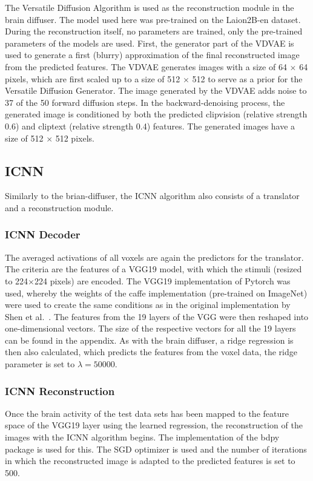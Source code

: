 The Versatile Diffusion Algorithm is used as the reconstruction module in the brain diffuser. The model used here was pre-trained on the Laion2B-en\cite{schuhmannLAION400MOpenDataset2021} dataset. During the reconstruction itself, no parameters are trained, only the pre-trained parameters of the models are used. First, the generator part of the VDVAE is used to generate a first (blurry) approximation of the final reconstructed image from the predicted features. The VDVAE generates images with a size of 64 $\times$ 64 pixels, which are first scaled up to a size of 512 $\times$ 512 to serve as a prior for the Versatile Diffusion Generator. The image generated by the VDVAE adds noise to 37 of the 50 forward diffusion steps. In the backward-denoising process, the generated image is conditioned by both the predicted clipvision (relative strength 0.6) and cliptext (relative strength 0.4) features. The generated images have a size of 512 $\times$ 512 pixels. 

\subsection{ICNN}
Similarly to the brian-diffuser, the ICNN\cite{shenDeepImageReconstruction2019} algorithm also consists of a translator and a reconstruction module. 
\subsubsection{ICNN Decoder}
The averaged activations of all voxels are again the predictors for the translator. The criteria are the features of a VGG19\cite{simonyanVeryDeepConvolutional2014} model, with which the stimuli (resized to 224$\times$224 pixels) are encoded. The VGG19 implementation of Pytorch was used, whereby the weights of the caffe implementation\cite{ModelZoo} (pre-trained on ImageNet) were used to create the same conditions as in the original implementation by Shen et al.\ \cite{shenDeepImageReconstruction2019}. The features from the 19 layers of the VGG were then reshaped into one-dimensional vectors. The size of the respective vectors for all the 19 layers can be found in the appendix. As with the brain diffuser, a ridge regression is then also calculated, which predicts the features from the voxel data, the ridge parameter is set to $\lambda=50000$.

\subsubsection{ICNN Reconstruction}
Once the brain activity of the test data sets has been mapped to the feature space of the VGG19 layer using the learned regression, the reconstruction of the images with the ICNN algorithm\cite{shenDeepImageReconstruction2019} begins. The implementation of the bdpy package\cite{KamitaniLabBdpy2024} is used for this. The SGD optimizer is used and the number of iterations in which the reconstructed image is adapted to the predicted features is set to 500. 

